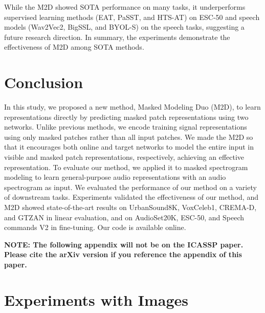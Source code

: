 \documentclass{article}
\begin{document}
While the M2D showed SOTA performance on many tasks, it underperforms supervised learning methods (EAT\cite{gazneli2022EAT}, PaSST\cite{Koutini2022passt}, and HTS-AT\cite{Chen2022HTS-AT}) on ESC-50 and speech models (Wav2Vec2\cite{baevski2020wav2vec2}, BigSSL\cite{zhang2021bigssl}, and BYOL-S\cite{scheidwasserclow2021serab}) on the speech tasks, suggesting a future research direction.
In summary, the experiments demonstrate the effectiveness of M2D among SOTA methods.



\section{Conclusion}
\label{sec:conclusion}


In this study, we proposed a new method, Masked Modeling Duo (M2D), to learn representations directly by predicting masked patch representations using two networks. Unlike previous methods, we encode training signal representations using only masked patches rather than all input patches.
We made the M2D so that it encourages both online and target networks to model the entire input in visible and masked patch representations, respectively, achieving an effective representation.
To evaluate our method, we applied it to masked spectrogram modeling to learn general-purpose audio representations with an audio spectrogram as input. We evaluated the performance of our method on a variety of downstream tasks.
Experiments validated the effectiveness of our method, and M2D showed state-of-the-art results on UrbanSound8K, VoxCeleb1, CREMA-D, and GTZAN in linear evaluation, and on AudioSet20K, ESC-50, and Speech commands V2 in fine-tuning.
Our code is available online.

\vfill


\footnotesize{}



\newpage

\appendix


\noindent \textbf{NOTE: The following appendix will not be on the ICASSP paper. Please cite the arXiv version if you reference the appendix of this paper.}
\vspace{0.5cm}

\section{Experiments with Images}
\end{document}

